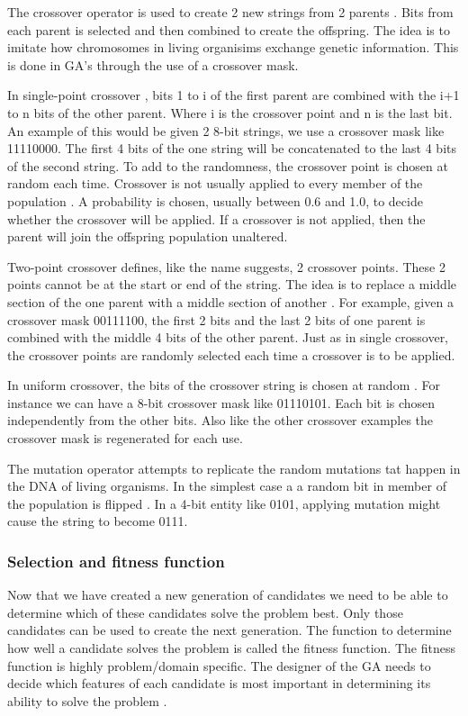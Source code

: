 \documentclass[12pt,a4paper]{report}
\begin{document}
The crossover operator is used to create 2 new strings from 2 parents \citep{michell}. Bits from each parent is selected and then combined to create the offspring. The idea is to imitate how chromosomes in living organisims exchange genetic information. This is done in GA's through the use of a crossover mask. 

In single-point crossover \citep{michell}, bits 1 to i of the first parent are combined with the i+1 to n bits of the other parent. Where i is the crossover point and n is the last bit. An example of this would be given 2 8-bit strings, we use a crossover mask like 11110000. The first 4 bits of the one string will be concatenated to the last 4 bits of the second string. To add to the randomness, the crossover point is chosen at random each time. Crossover is not usually applied to every member of the population \citep{beasley}. A probability is chosen, usually between 0.6 and 1.0, to decide whether the crossover will be applied. If a crossover is not applied, then the parent will join the offspring population unaltered.

Two-point crossover defines, like the name suggests, 2 crossover points. These 2 points cannot be at the start or end of the string. The idea is to replace a middle section of the one parent with a middle section of another \citep{michell}. For example, given a crossover mask 00111100, the first 2 bits and the last 2 bits of one parent is combined with the middle 4 bits of the other parent. Just as in single crossover, the crossover points are randomly selected each time a crossover is to be applied.

In uniform crossover, the bits of the crossover string is chosen at random \citep{michell}. For instance we can have a 8-bit crossover mask like 01110101. Each bit is chosen independently from the other bits. Also like the other crossover examples the crossover mask is regenerated for each use.

The mutation operator attempts to replicate the random mutations tat happen in the DNA of living organisms. In the simplest case a a random bit in member of the population is flipped \citep{michell}. In a 4-bit entity like 0101, applying mutation might cause the string to become 0111.   

\subsubsection{Selection and fitness function}
Now that we have created a new generation of candidates we need to be able to determine which of these candidates solve the problem best. Only those candidates can be used to create the next generation. The function to determine how well a candidate solves the problem is called the fitness function. The fitness function is highly problem/domain specific. The designer of the GA needs to decide which features of each candidate is most important in determining its ability to solve the problem \citep{beasley}.
\end{document}
